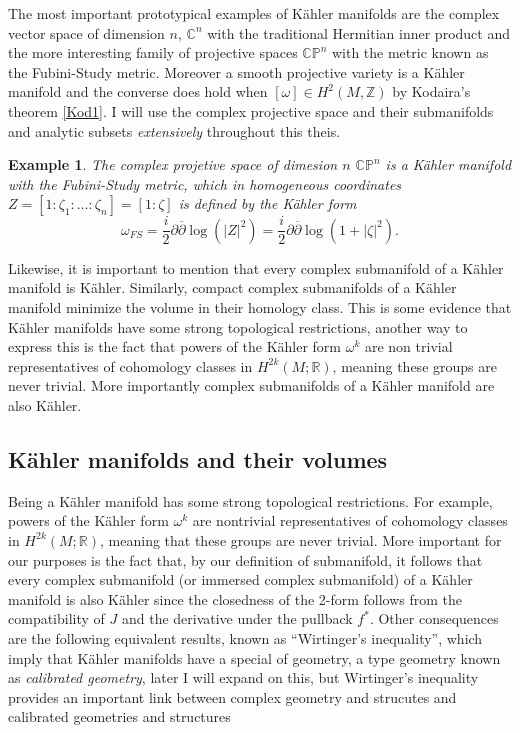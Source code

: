 \documentclass[12pt,twoside,a4paper]{report}
\newtheorem{example}{Example}
\newcommand{\zah}{\ensuremath{ \mathbb Z }}
\newcommand{\re}{\ensuremath{\mathbb R }}
\newcommand{\con}{\ensuremath{\mathbb{C}^n}}
\newcommand{\cp}{\ensuremath{\mathbb{CP}}}
\begin{document}
  The most important prototypical examples of K\"ahler manifolds are the complex vector space of dimension $n$, $\con$ with the traditional Hermitian inner product and the more interesting family of projective spaces $\cp^{n}$ with the metric known as the Fubini-Study metric. Moreover a smooth projective variety is a Kähler manifold and the converse does hold when $[\omega]\in H^{2}(M,\zah)$ by Kodaira's theorem \ref{Kod1}. I will use the complex projective space and their submanifolds and analytic subsets \emph{extensively} throughout this theis.

  \begin{example}
    The complex projetive space of dimesion $n$ $\cp^{n}$ is a Kähler manifold with the Fubini-Study metric, which in homogeneous coordinates $Z=[1:\zeta_{1}:\dots:\zeta_{n}]=[1:\zeta]$ is defined by the Kähler form
    \[
      \omega_{FS}=\frac{i}{2}\partial \overline{\partial}\log(|Z|^{2})=\frac{i}{2}\partial \overline{\partial}\log(1+|\zeta|^{2}).
    \]
  \end{example}

  Likewise, it is important to mention that every complex submanifold of a Kähler manifold is Kähler. Similarly, compact complex submanifolds of a Kähler manifold minimize the volume in their homology class. This is some evidence that Kähler manifolds have some strong topological restrictions, another way to express this is the fact that powers of the Kähler form $\omega^k$ are non trivial representatives of cohomology classes in $H^{2k}(M ;\re)$, meaning these groups are never trivial. More importantly complex submanifolds of a Kähler manifold are also Kähler.

  \subsection{Kähler manifolds and their volumes}
  Being a Kähler manifold has some strong topological restrictions. For example, powers of the K\"ahler form $\omega^k$ are nontrivial representatives of cohomology classes in $H^{2k}(M ;\re)$, meaning that these groups are never trivial.
  More important for our purposes is the fact that, by our definition of submanifold, it follows that every complex submanifold (or immersed complex submanifold) of a K\"ahler manifold is also Kähler since the closedness of the 2-form follows from the compatibility of $J$ and the derivative under the pullback $f^*$. Other consequences are the following equivalent results, known as ``Wirtinger's inequality'', which imply that Kähler manifolds have a special of geometry, a type geometry known as \emph{calibrated geometry}, later I will expand on this, but Wirtinger's inequality provides an important link between complex geometry and strucutes and calibrated geometries and structures
\end{document}
